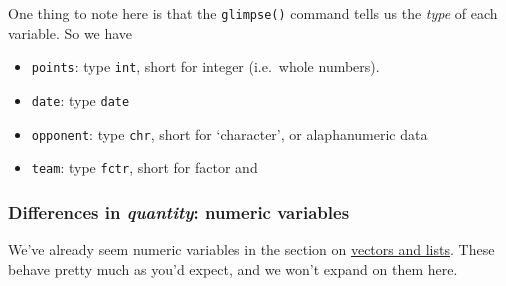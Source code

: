 \documentclass[]{article}
\newenvironment{Shaded}{\begin{snugshade}}{\end{snugshade}}
\newcommand{\KeywordTok}[1]{\textcolor[rgb]{0.13,0.29,0.53}{\textbf{#1}}}
\newcommand{\StringTok}[1]{\textcolor[rgb]{0.31,0.60,0.02}{#1}}
\newcommand{\OperatorTok}[1]{\textcolor[rgb]{0.81,0.36,0.00}{\textbf{#1}}}
\newcommand{\NormalTok}[1]{#1}
\providecommand{\tightlist}{%
  \setlength{\itemsep}{0pt}\setlength{\parskip}{0pt}}
\let\oldparagraph\paragraph
\renewcommand{\paragraph}[1]{\oldparagraph{#1}\mbox{}}
\theoremstyle{definition}
\theoremstyle{definition}
\theoremstyle{definition}
\theoremstyle{remark}
\begin{document}
\begin{Shaded}
\end{Shaded}

One thing to note here is that the \texttt{glimpse()} command tells us
the \emph{type} of each variable. So we have

\begin{itemize}
\tightlist
\item
  \texttt{points}: type \texttt{int}, short for integer (i.e.~whole
  numbers).
\item
  \texttt{date}: type \texttt{date}
\item
  \texttt{opponent}: type \texttt{chr}, short for `character', or
  alaphanumeric data
\item
  \texttt{team}: type \texttt{fctr}, short for factor and
\end{itemize}

\subsubsection*{\texorpdfstring{Differences in \emph{quantity}: numeric
variables}{Differences in quantity: numeric variables}}\label{differences-in-quantity-numeric-variables}

We've already seem numeric variables in the section on
\protect\hyperlink{vectors}{vectors and lists}. These behave pretty much
as you'd expect, and we won't expand on them here.

\paragraph{}\label{section-8}
\end{document}

